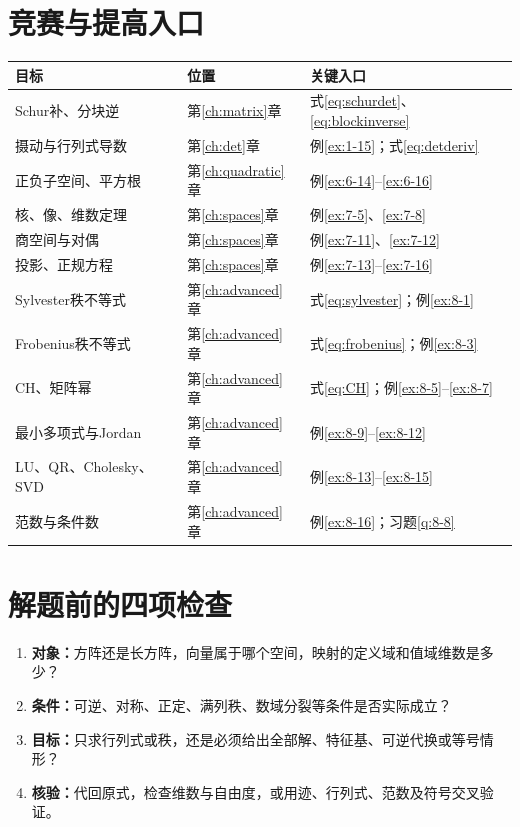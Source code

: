 \section{竞赛与提高入口}
\begin{longtable}{@{}p{}p{}p{}@{}}
\toprule 目标&位置&关键入口\\\midrule\endhead
Schur补、分块逆&第\ref{ch:matrix}章&式\eqref{eq:schurdet}、\eqref{eq:blockinverse}\\
摄动与行列式导数&第\ref{ch:det}章&例\ref{ex:1-15}；式\eqref{eq:detderiv}\\
正负子空间、平方根&第\ref{ch:quadratic}章&例\ref{ex:6-14}--\ref{ex:6-16}\\
核、像、维数定理&第\ref{ch:spaces}章&例\ref{ex:7-5}、\ref{ex:7-8}\\
商空间与对偶&第\ref{ch:spaces}章&例\ref{ex:7-11}、\ref{ex:7-12}\\
投影、正规方程&第\ref{ch:spaces}章&例\ref{ex:7-13}--\ref{ex:7-16}\\
Sylvester秩不等式&第\ref{ch:advanced}章&式\eqref{eq:sylvester}；例\ref{ex:8-1}\\
Frobenius秩不等式&第\ref{ch:advanced}章&式\eqref{eq:frobenius}；例\ref{ex:8-3}\\
CH、矩阵幂&第\ref{ch:advanced}章&式\eqref{eq:CH}；例\ref{ex:8-5}--\ref{ex:8-7}\\
最小多项式与Jordan&第\ref{ch:advanced}章&例\ref{ex:8-9}--\ref{ex:8-12}\\
LU、QR、Cholesky、SVD&第\ref{ch:advanced}章&例\ref{ex:8-13}--\ref{ex:8-15}\\
范数与条件数&第\ref{ch:advanced}章&例\ref{ex:8-16}；习题\ref{q:8-8}\\
\bottomrule
\end{longtable}
\section{解题前的四项检查}
\begin{enumerate}
\item \textbf{对象：}方阵还是长方阵，向量属于哪个空间，映射的定义域和值域维数是多少？
\item \textbf{条件：}可逆、对称、正定、满列秩、数域分裂等条件是否实际成立？
\item \textbf{目标：}只求行列式或秩，还是必须给出全部解、特征基、可逆代换或等号情形？
\item \textbf{核验：}代回原式，检查维数与自由度，或用迹、行列式、范数及符号交叉验证。
\end{enumerate}
